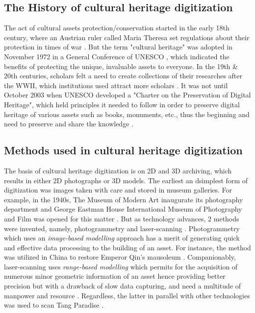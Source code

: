 \documentclass[a4paper, 12pt]{article}
\begin{document}
\subsection{\textbf{The History of cultural heritage digitization}}
The act of cultural assets protection/conservation started in the early 18th century, where an Austrian ruler called Maria Theresa set regulations about their protection in times of war \cite{germ72}.
But the term "cultural heritage" was adopted in November 1972 in a General Conference of UNESCO \cite{batisse01}, which indicated the benefits of protecting the unique, invaluable assets to everyone.
In the 19th \& 20th centuries, scholars felt a need to create collections of their researches after the WWII, which institutions used attract more scholars \cite{Note2011}. It was not until October 2003 when UNESCO developed a
"Charter on the Preservation of Digital Heritage", which held principles it needed to follow in order to preserve digital heritage of various assets such as
books, monuments, etc., thus the beginning and need to preserve and share the knowledge \cite{charter002}. \\

\subsection{\textbf{Methods used in cultural heritage digitization}}
The basis of cultural heritage digitization is on 2D and 3D archiving, which results in either 2D photographs or 3D models. The earliest an dsimplest form of digitization was images taken with care and stored in
museum galleries. For example, in the 1940s, The Museum of Modern Art inaugurate its photography department and George Eastman House International Museum of Photography and Film was
opened for this matter \cite{Note2011}. But as technology advances, 2 methods were invented, namely, photogrammetry and laser-scanning \cite{dgpht}. Photogrammetry which uses an \textit{image-based modelling} approach has a merit of
generating quick and effective data processing to the building of an asset. For instance, the method was utilized in China to restore  Emperor Qin’s mausoleum \cite{Zhou2012}. Companionably, laser-scanning uses \textit{range-based modelling}
which permits for the acquisition of numerous minor geometric information of an asset hence providing better precision \cite{dgpht} but with a drawback of slow data capturing, and need a multitude of manpower and resource \cite{Zhou2012}.
Regardless, the latter in parallel with other technologies was used to scan Tang Paradise \cite{dgpht}.
\end{document}
